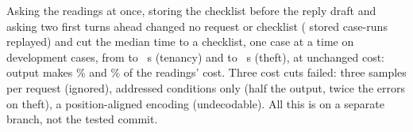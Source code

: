 Asking the readings at once, storing the checklist before the reply draft and asking two first turns ahead changed no request or checklist (\fuReplayCaseRuns{} stored case-runs replayed) and cut the median time to a checklist, one case at a time on \fuTimeCases{} development cases, from \fuTimeTenBaseFull{} to \fuTimeTenBranchFull~s (tenancy) and \fuTimeThBaseFull{} to \fuTimeThBranchFull~s (theft), at unchanged cost: output makes \fuReadingOutputShareTen\% and \fuReadingOutputShareTh\% of the readings' cost. Three cost cuts failed: three samples per request (ignored), addressed conditions only (half the output, twice the errors on theft), a position-aligned encoding (undecodable). All this is on a separate branch, not the tested commit.
